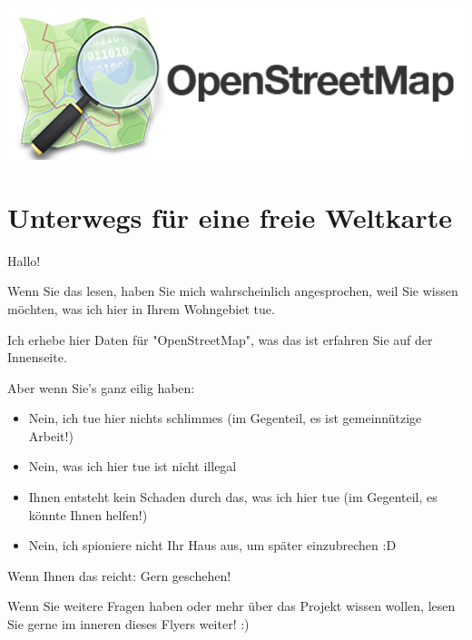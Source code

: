 \documentclass[10pt,foldmark,notumble]{leaflet}
\begin{document}
    \includegraphics[width=\linewidth]{logo.png}

    \section{Unterwegs für eine freie Weltkarte}
    Hallo!

    Wenn Sie das lesen, haben Sie mich wahrscheinlich angesprochen, weil Sie wissen möchten, was ich hier in Ihrem Wohngebiet tue.

    Ich erhebe hier Daten für "OpenStreetMap", was das ist erfahren Sie auf der Innenseite.

    Aber wenn Sie's ganz eilig haben:
    \begin{itemize}[noitemsep,topsep=0pt]
        \item Nein, ich tue hier nichts schlimmes {\small(im Gegenteil, es ist gemeinnützige Arbeit!)}
        \item Nein, was ich hier tue ist nicht illegal
        \item Ihnen entsteht kein Schaden durch das, was ich hier tue {\small(im Gegenteil, es könnte Ihnen helfen!)}
        \item Nein, ich spioniere nicht Ihr Haus aus, um später einzubrechen :D
    \end{itemize}
    Wenn Ihnen das reicht: Gern geschehen!

    Wenn Sie weitere Fragen haben oder mehr über das Projekt wissen wollen, lesen Sie gerne im inneren dieses Flyers weiter! :)
\end{document}
